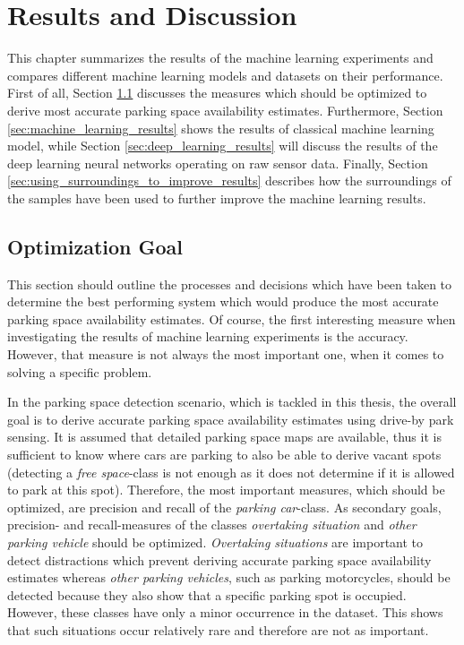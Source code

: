 \chapter{Results and Discussion}
\label{chap:evaluation}

This chapter summarizes the results of the machine learning experiments and compares different machine learning models and datasets on their performance. First of all, Section \ref{sec:optimization_goal} discusses the measures which should be optimized to derive most accurate parking space availability estimates. Furthermore, Section \ref{sec:machine_learning_results} shows the results of classical machine learning model, while Section \ref{sec:deep_learning_results} will discuss the results of the deep learning neural networks operating on raw sensor data. Finally, Section \ref{sec:using_surroundings_to_improve_results} describes how the surroundings of the samples have been used to further improve the machine learning results.






\section{Optimization Goal}
\label{sec:optimization_goal}

This section should outline the processes and decisions which have been taken to determine the best performing system which would produce the most accurate parking space availability estimates. Of course, the first interesting measure when investigating the results of machine learning experiments is the accuracy. However, that measure is not always the most important one, when it comes to solving a specific problem. 

In the parking space detection scenario, which is tackled in this thesis, the overall goal is to derive accurate parking space availability estimates using drive-by park sensing. It is assumed that detailed parking space maps are available, thus it is sufficient to know where cars are parking to also be able to derive vacant spots (detecting a \emph{free space}-class is not enough as it does not determine if it is allowed to park at this spot). Therefore, the most important measures, which should be optimized, are precision and recall of the \emph{parking car}-class. As secondary goals, precision- and recall-measures of the classes \emph{overtaking situation} and \emph{other parking vehicle} should be optimized. \emph{Overtaking situations} are important to detect distractions which prevent deriving accurate parking space availability estimates whereas \emph{other parking vehicles}, such as parking motorcycles, should be detected because they also show that a specific parking spot is occupied. However, these classes have only a minor occurrence in the dataset. This shows that such situations occur relatively rare and therefore are not as important. 

